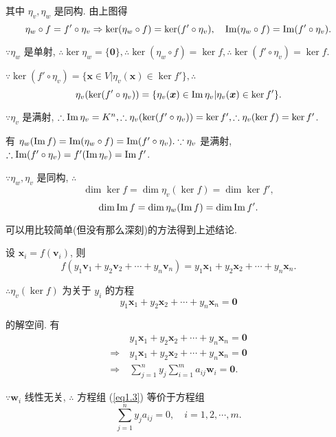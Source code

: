 \documentclass[color=black,device=normal,lang=cn,mode=geye]{elegantnote}
\begin{document}
其中 $\eta_v,\eta_w$ 是同构. 由上图得
\[\eta_w\circ f=f'\circ\eta_v\Rightarrow\ker(\eta_w\circ f)=\ker(f'\circ\eta_v),\quad\operatorname{Im} (\eta_w\circ f)=\operatorname{Im} (f'\circ\eta_v).\]

$\because\eta_w$ 是单射, $\therefore\ker\eta_w=\{\boldsymbol{0}\},\therefore\ker(\eta_w\circ f)=\ker f,\therefore\ker(f'\circ\eta_v)=\ker f$.

$\because\ker(f'\circ\eta_v)=\{\boldsymbol{x}\in V|\eta_v(\boldsymbol{x})\in\ker f'\},\therefore$
\[\eta_v(\ker(f'\circ\eta_v))=\{\eta_v(\boldsymbol{x})\in\operatorname{Im} \eta_v|\eta_v(\boldsymbol{x})\in\ker f'\}.\]

$\because\eta_v$ 是满射, $\therefore\operatorname{Im} \eta_v=K^n,\therefore\eta_v(\ker(f'\circ\eta_v))=\ker f',\therefore\eta_v(\ker f)=\ker f'$.

有 $\eta_w(\operatorname{Im} f)=\operatorname{Im} (\eta_w\circ f)=\operatorname{Im} (f'\circ\eta_v).\because\eta_v$ 是满射, $\therefore\operatorname{Im} (f'\circ\eta_v)=f'(\operatorname{Im} \eta_v)=\operatorname{Im} f'$.

$\because\eta_w,\eta_v$ 是同构, $\therefore$
\[\dim\ker f=\dim\eta_v(\ker f)=\dim\ker f',\]
\begin{equation}\label{eq1.2}
    \dim\operatorname{Im} f=\dim\eta_w(\operatorname{Im} f)=\dim\operatorname{Im} f'.
\end{equation}

可以用比较简单(但没有那么深刻)的方法得到上述结论.

设 $\boldsymbol{x}_i=f(\boldsymbol{v}_i)$, 则
\[f(y_1\boldsymbol{v}_1+y_2\boldsymbol{v}_2+\cdots+y_n\boldsymbol{v}_n)=y_1\boldsymbol{x}_1+y_2\boldsymbol{x}_2+\cdots+y_n\boldsymbol{x}_n.\]

$\therefore\eta_v(\ker f)$ 为关于 $y_i$ 的方程
\begin{equation}\label{eq1.3}
    y_1\boldsymbol{x}_1+y_2\boldsymbol{x}_2+\cdots+y_n\boldsymbol{x}_n=\boldsymbol{0}
\end{equation}

的解空间. 有
\begin{align*}
    & \ y_1\boldsymbol{x}_1+y_2\boldsymbol{x}_2+\cdots+y_n\boldsymbol{x}_n=\boldsymbol{0} \\
    \Rightarrow & \ y_1\boldsymbol{x}_1+y_2\boldsymbol{x}_2+\cdots+y_n\boldsymbol{x}_n=\boldsymbol{0} \\
    \Rightarrow & \ \sum\limits_{j=1}^ny_j\sum\limits_{i=1}^ma_{ij}\boldsymbol{w}_i=\boldsymbol{0}.
\end{align*}

$\because\boldsymbol{w}_i$ 线性无关, $\therefore$ 方程组 (\ref{eq1.3}) 等价于方程组
\[\sum\limits_{j=1}^ny_ja_{ij}=0,\quad i=1,2,\cdots,m.\]
\end{document}
